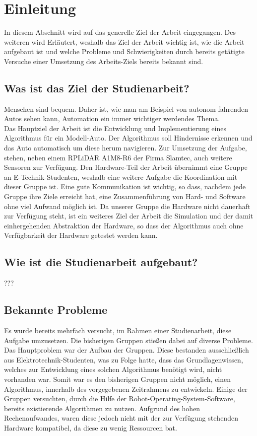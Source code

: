 \section{Einleitung}
In diesem Abschnitt wird auf das generelle Ziel der Arbeit eingegangen.
Des weiteren wird Erläutert, weshalb das Ziel der Arbeit wichtig ist, wie die Arbeit aufgebaut ist und welche Probleme und Schwierigkeiten durch bereits getätigte Versuche einer Umsetzung des Arbeits-Ziels bereits bekannt sind.

\subsection{Was ist das Ziel der Studienarbeit?}
    Menschen sind bequem.
    Daher ist, wie man am Beispiel von autonom fahrenden Autos sehen kann, Automation ein immer wichtiger werdendes Thema.\\

    Das Hauptziel der Arbeit ist die Entwicklung und Implementierung eines Algorithmus für ein Modell-Auto. 
    Der Algorithmus soll Hindernisse erkennen und das Auto automatisch um diese herum navigieren.
    Zur Umsetzung der Aufgabe, stehen, neben einem RPLiDAR A1M8-R6 der Firma Slamtec, auch weitere Sensoren zur Verfügung.
    Den Hardware-Teil der Arbeit übernimmt eine Gruppe an E-Technik-Studenten, weshalb eine weitere Aufgabe die Koordination mit dieser Gruppe ist.
    Eine gute Kommunikation ist wichtig, so dass, nachdem jede Gruppe ihre Ziele erreicht hat, eine Zusammenführung von Hard- und Software ohne viel Aufwand möglich ist.
    Da unserer Gruppe die Hardware nicht dauerhaft zur Verfügung steht, ist ein weiteres Ziel der Arbeit die Simulation und der damit einhergehenden Abstraktion der Hardware, so dass der Algorithmus auch ohne Verfügbarkeit der Hardware getestet werden kann.    

\subsection{Wie ist die Studienarbeit aufgebaut?}
    ???

\subsection{Bekannte Probleme}
    Es wurde bereits mehrfach versucht, im Rahmen einer Studienarbeit, diese Aufgabe umzusetzen.
    Die bisherigen Gruppen stießen dabei auf diverse Probleme.
    Das Hauptproblem war der Aufbau der Gruppen.
    Diese bestanden ausschließlich aus Elektrotechnik-Studenten, was zu Folge hatte, dass das Grundlagenwissen, welches zur Entwicklung eines solchen Algorithmus benötigt wird, nicht vorhanden war.
    Somit war es den bisherigen Gruppen nicht möglich, einen Algorithmus, innerhalb des vorgegebenen Zeitrahmens zu entwickeln.
    Einige der Gruppen versuchten, durch die Hilfe der Robot-Operating-System-Software, bereits existierende Algorithmen zu nutzen. 
    Aufgrund des hohen Rechenaufwandes, waren diese jedoch nicht mit der zur Verfügung stehenden Hardware kompatibel, da diese zu wenig Ressourcen bat.\\

